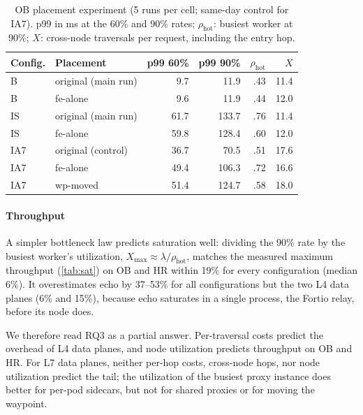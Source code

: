 \begin{table}[t]
  \centering
  \caption{OB placement experiment (5 runs per cell; same-day control for
           IA7). p99 in ms at the 60\% and 90\% rates; $\rho_{\text{hot}}$:
           busiest worker at 90\%; $X$: cross-node traversals per request,
           including the entry hop.}
  \label{tab:placement}
  \footnotesize
  \setlength{\tabcolsep}{3pt}
  \begin{tabular}{@{}llrrrr@{}}
    \toprule
    Config. & Placement & p99 60\% & p99 90\% & $\rho_{\text{hot}}$ & $X$ \\
    \midrule
    B   & original (main run)      & 9.7  & 11.9  & .43 & 11.4 \\
    B   & fe-alone                 & 9.6  & 11.9  & .44 & 12.0 \\
    IS  & original (main run)      & 61.7 & 133.7 & .76 & 11.4 \\
    IS  & fe-alone                 & 59.8 & 128.4 & .60 & 12.0 \\
    IA7 & original (control)       & 36.7 & 70.5  & .51 & 17.6 \\
    IA7 & fe-alone                 & 49.4 & 106.3 & .72 & 16.6 \\
    IA7 & wp-moved                 & 51.4 & 124.7 & .58 & 18.0 \\
    \bottomrule
  \end{tabular}
\end{table}

\paragraph{Throughput}
A simpler bottleneck law predicts saturation well: dividing the 90\% rate by
the busiest worker's utilization, $X_{\max} \approx \lambda/\rho_{\text{hot}}$,
matches the measured maximum throughput (\cref{tab:sat}) on OB and HR within
19\% for every configuration (median 6\%). It overestimates echo by 37--53\%
for all configurations but the two L4 data planes (6\% and 15\%), because
echo saturates in a single process, the Fortio relay, before its node does.

We therefore read RQ3 as a partial answer. Per-traversal costs predict the
overhead of L4 data planes, and node utilization predicts throughput on OB and HR. For L7
data planes, neither per-hop costs, cross-node hops, nor node utilization
predict the tail; the utilization of the busiest proxy instance does better for
per-pod sidecars, but not for shared proxies or for moving the waypoint.

